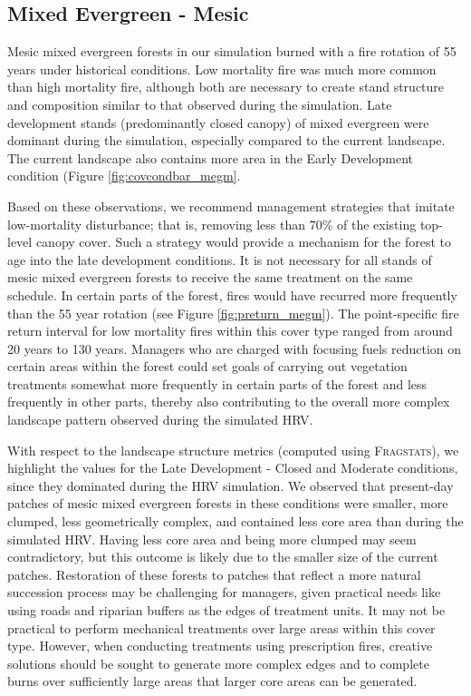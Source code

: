 \subsection{Mixed Evergreen - Mesic}
Mesic mixed evergreen forests in our simulation burned with a fire rotation of 55 years under historical conditions. Low mortality fire was much more common than high mortality fire, although both are necessary to create stand structure and composition similar to that observed during the simulation. Late development stands (predominantly closed canopy) of mixed evergreen were dominant during the simulation, especially compared to the current landscape. The current landscape also contains more area in the Early Development condition (Figure \ref{fig:covcondbar_megm}. 

Based on these observations, we recommend management strategies that imitate low-mortality disturbance; that is, removing less than 70\% of the existing top-level canopy cover. Such a strategy would provide a mechanism for the forest to age into the late development conditions. It is not necessary for all stands of mesic mixed evergreen forests to receive the same treatment on the same schedule. In certain parts of the forest, fires would have recurred more frequently than the 55 year rotation (see Figure \ref{fig:preturn_megm}). The point-specific fire return interval for low mortality fires within this cover type ranged from around 20 years to 130 years. Managers who are charged with focusing fuels reduction on certain areas within the forest could set goals of carrying out vegetation treatments somewhat more frequently in certain parts of the forest and less frequently in other parts, thereby also contributing to the overall more complex landscape pattern observed during the simulated HRV. 



With respect to the landscape structure metrics (computed using \textsc{Fragstats}), we highlight the values for the Late Development - Closed and Moderate conditions, since they dominated during the HRV simulation. We observed that present-day patches of mesic mixed evergreen forests in these conditions were smaller, more clumped, less geometrically complex, and contained less core area than during the simulated HRV. Having less core area and being more clumped may seem contradictory, but this outcome is likely due to the smaller size of the current patches. Restoration of these forests to patches that reflect a more natural succession process may be challenging for managers, given practical needs like using roads and riparian buffers as the edges of treatment units. It may not be practical to perform mechanical treatments over large areas within this cover type. However, when conducting treatments using prescription fires, creative solutions should be sought to generate more complex edges and to complete burns over sufficiently large areas that larger core areas can be generated.

